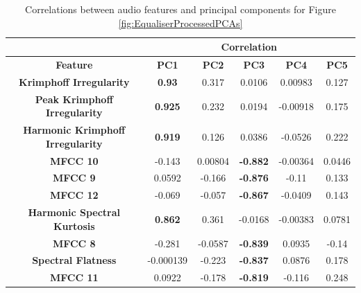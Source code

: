 		\begin{table}
			\centering
			\begin{tabular}{|c|c|c|c|c|c|}
				\cline{2-6}
				\multicolumn{1}{c|}{} & \multicolumn{5}{c|}{\bf{Correlation}} \tabularnewline
				\hline
				\bf{Feature} & \bf{PC1} & \bf{PC2} & \bf{PC3} & \bf{PC4} & \bf{PC5} \tabularnewline
				\hline
				\hline
				\bf{Krimphoff Irregularity} & \bf{0.93} & 0.317 & 0.0106 & 0.00983 & 0.127 \tabularnewline
				\hline
				\bf{Peak Krimphoff Irregularity} & \bf{0.925} & 0.232 & 0.0194 & -0.00918 & 0.175 \tabularnewline
				\hline
				\bf{Harmonic Krimphoff Irregularity} & \bf{0.919} & 0.126 & 0.0386 & -0.0526 & 0.222 \tabularnewline
				\hline
				\bf{MFCC 10} & -0.143 & 0.00804 & \bf{-0.882} & -0.00364 & 0.0446 \tabularnewline
				\hline
				\bf{MFCC 9} & 0.0592 & -0.166 & \bf{-0.876} & -0.11 & 0.133 \tabularnewline
				\hline
				\bf{MFCC 12} & -0.069 & -0.057 & \bf{-0.867} & -0.0409 & 0.143 \tabularnewline
				\hline
				\bf{Harmonic Spectral Kurtosis} & \bf{0.862} & 0.361 & -0.0168 & -0.00383 & 0.0781 \tabularnewline
				\hline
				\bf{MFCC 8} & -0.281 & -0.0587 & \bf{-0.839} & 0.0935 & -0.14 \tabularnewline
				\hline
				\bf{Spectral Flatness} & -0.000139 & -0.223 & \bf{-0.837} & 0.0876 & 0.178 \tabularnewline
				\hline
				\bf{MFCC 11} & 0.0922 & -0.178 & \bf{-0.819} & -0.116 & 0.248 \tabularnewline
				\hline
			\end{tabular}
			\caption{Correlations between audio features and principal components for Figure
				 \ref{fig:EqualiserProcessedPCAs}}
			\label{fig:EqualiserProcessedCorrelations}
		\end{table}


